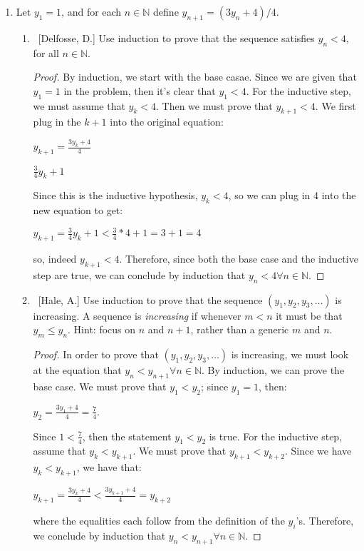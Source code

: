 \documentclass[10pt]{article}
\begin{document}
\begin{enumerate}
\item  Let $y_1=1$, and for each $n \in \mathbb{N}$ define $y_{n+1} = (3y_n+4)/4$.

	\begin{enumerate}
	
	\item  ~[Delfosse, D.] Use induction to prove that the sequence satisfies $y_n < 4$, for all $n \in \mathbb{N}$.
 \begin{proof}
 By induction, we start with the base casae.  Since we are given that $y_1 = 1$ in the problem, then it's clear that $y_1 < 4$.  For the inductive step, we must assume that $y_k < 4$.  Then we must prove that $y_{k+1} < 4$.  We first plug in the $k+1$ into the original equation:
 \begin{center}
 $y_{k+1} = \frac{3y_k+4}{4}$
 
 $\frac{3}{4}y_k + 1$
 \end{center}
 Since this is the inductive hypothesis, $y_k < 4$, so we can plug in 4 into the new equation to get:
 \begin{center}
 $y_{k+1} = \frac{3}{4}y_k + 1 < \frac{3}{4}*4+1=3+1=4$
 \end{center}
 so, indeed $y_{k+1} < 4$.  Therefore, since both the base case and the inductive step are true, we can conclude by induction that $y_n < 4 \forall n \in \mathbb{N}$.
 \end{proof}
	
	\item  ~[Hale, A.] Use induction to prove that the sequence $(y_1, y_2, y_3, \ldots)$ is increasing.  A sequence is \emph{increasing} if whenever $m < n$ it must be that $y_m \leq y_n$.  Hint: focus on $n$ and $n+1$, rather than a generic $m$ and $n$.
 \begin{proof}
 In order to prove that  $(y_1, y_2, y_3, \ldots)$ is increasing, we must look at the equation that $y_n < y_{n+1} \forall n \in \mathbb{N}$.  By induction, we can prove the base case.  We must prove that $y_1 < y_2$; since $y_1 = 1$, then: 
 \begin{center}
     $y_2 = \frac{3y_1+4}{4} = \frac{7}{4}$.
 \end{center}
 Since $1 < \frac{7}{4}$, then the statement $y_1 < y_2$ is true.  For the inductive step, assume that $y_k < y_{k+1}$.  We must prove that $y_{k+1}<y_{k+2}$.  Since we have $y_k < y_{k+1}$, we have that: 
 \begin{center}
  $y_{k+1} = \frac{3y_k+4}{4} < \frac{3y_{k+1}+4}{4} = y_{k+2}$    
 \end{center}
 where the equalities each follow from the definition of the $y_i$'s.
 Therefore, we conclude by induction that $y_n < y_{n+1} \forall n \in \mathbb{N}$.
 \end{proof}	
	\end{enumerate}
	

\end{enumerate}
\end{document}
